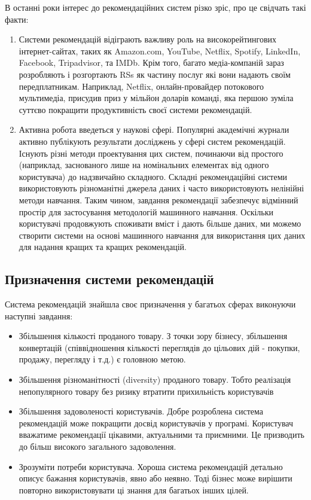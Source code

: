 В останні роки інтерес до рекомендаційних систем різко зріс, про це свідчать такі факти:
\begin{enumerate}
    \item Системи рекомендацій відіграють важливу роль на високорейтингових інтернет-сайтах, таких як Amazon.com, YouTube, Netflix, Spotify, LinkedIn, Facebook, Tripadvisor, та IMDb. Крім того, багато медіа-компаній зараз розробляють і розгортають RSs як частину послуг які вони надають своїм передплатникам. Наприклад, Netflix, онлайн-провайдер потокового мультимедіа, присудив приз у мільйон доларів команді, яка першою зуміла суттєво покращити продуктивність своєї системи рекомендацій.

    \item Активна робота введеться у наукові сфері. Популярні академічні журнали активно публікують результати досліджень у сфері систем рекомендацій. Існують різні методи проектування цих систем, починаючи від простого (наприклад, заснованого лише на номінальних елементах від одного користувача) до надзвичайно складного. Складні рекомендаційні системи використовують різноманітні джерела даних і часто використовують нелінійні методи навчання. Таким чином, завдання рекомендації забезпечує відмінний простір для застосування методологій машинного навчання. Оскільки користувачі продовжують споживати вміст і дають більше даних, ми можемо створити системи на основі машинного навчання для використання цих даних для надання кращих та кращих рекомендацій.
\end{enumerate}

\subsection{Призначення системи рекомендацій}
Система рекомендацій знайшла своє призначення у багатьох сферах виконуючи наступні завдання:
\begin{itemize}
    \item Збільшення кількості проданого товару. З точки зору бізнесу, збільшення конвертацій (співвідношення кількості переглядів до цільових дій - покупки, продажу, перегляду і т.д.) є головною метою.
    \item Збільшення різноманітності (diversity) проданого товару. Тобто реалізація непопулярного товару без ризику втратити прихильність користувачів
    \item Збільшення задоволеності користувачів. Добре розроблена система рекомендацій може покращити досвід користувачів у програмі. Користувач вважатиме рекомендації цікавими, актуальними та приємними. Це призводить до більш високого загального задоволення.
    \item Зрозуміти потреби користувача. Хороша система рекомендацій детально описує бажання користувачів, явно або неявно. Тоді бізнес може вирішити повторно використовувати ці знання для багатьох інших цілей.
\end{itemize}
